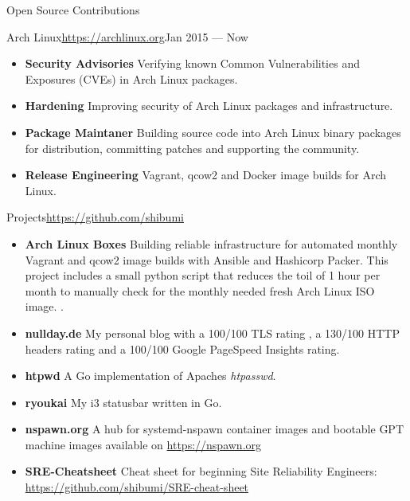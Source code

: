\documentclass[]{mcdowellcv}
\begin{document}
\begin{cvsection}{Open Source Contributions}
\begin{cvsubsection}{Arch Linux}{\url{https://archlinux.org}}{Jan 2015 --- Now}
\begin{itemize}
\item \textbf{Security Advisories} Verifying known Common Vulnerabilities and Exposures (CVEs) in Arch Linux packages.
\item \textbf{Hardening} Improving security of Arch Linux packages and infrastructure.
\item \textbf{Package Maintaner} Building source code into Arch Linux binary packages for distribution, committing patches and supporting the community.
\item \textbf{Release Engineering} Vagrant, qcow2 and Docker image builds for Arch Linux.
\end{itemize}
\end{cvsubsection}

\begin{cvsubsection}{Projects}{\url{https://github.com/shibumi}}{}
\begin{itemize}
\item \textbf{Arch Linux Boxes} Building reliable infrastructure for automated monthly Vagrant and qcow2 image builds with Ansible and Hashicorp Packer. This project includes a small python script that reduces the toil of 1 hour per month to manually check for the monthly needed fresh Arch Linux ISO image. .
\item \textbf{nullday.de} My personal blog with a 100/100 TLS rating , a 130/100 HTTP headers rating  and a 100/100 Google PageSpeed Insights rating.
\item \textbf{htpwd} A Go implementation of Apaches \textit{htpasswd}.
\item \textbf{ryoukai} My i3 statusbar written in Go.
\item \textbf{nspawn.org} A hub for systemd-nspawn container images and bootable GPT machine images available on \url{https://nspawn.org}
\item \textbf{SRE-Cheatsheet} Cheat sheet for beginning Site Reliability Engineers: \url{https://github.com/shibumi/SRE-cheat-sheet}
\end{itemize}
\end{cvsubsection}
\end{cvsection}
\end{document}
